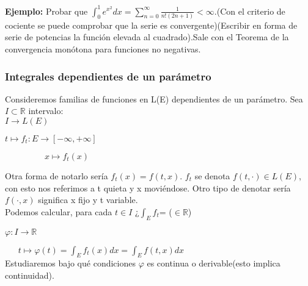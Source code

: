 \documentclass{article}
\begin{document}
\textbf{Ejemplo:} Probar que $\int_0^1 e^{x^2} dx = \sum_{n=0}^\infty \frac{1}{n!(2n+1)} < \infty$.(Con el criterio de cociente se puede comprobar que la serie es convergente)(Escribir en forma de serie de potencias la función elevada al cuadrado).Sale con el Teorema de la convergencia monótona para funciones no negativas.

\subsubsection{Integrales dependientes de un parámetro}
Consideremos familias de funciones en L(E) dependientes de un parámetro. Sea $I \subset \mathbb{R}$ intervalo: \\

$I \longrightarrow L(E)$

$t \longmapsto f_t: E \rightarrow [-\infty,+\infty]$

$\>\>\>\>\>\>\>\>\>\>\>\>\>\>\>\>\>\>\>\>\>	x \longmapsto f_t(x)$

Otra forma de notarlo sería $f_t(x)=f(t,x)$. $f_t$ se denota $f(t,\cdot) \in L(E)$, con esto nos referimos a t quieta y x moviéndose. Otro tipo de denotar sería $f(\cdot, x)$ significa x fijo y t variable. \\

Podemos calcular, para cada $t \in I$ ¿$\int_E f_t$= ($\in \mathbb{R}$)

$\varphi: I \longrightarrow \mathbb{R}$

$\>\>\>\>\>\>\> t \longmapsto \varphi(t)=\int_E f_t(x) dx = \int_E f(t,x) dx$ \\

Estudiaremos bajo qué condiciones $\varphi$ es continua o derivable(esto implica continuidad). \\
\end{document}
